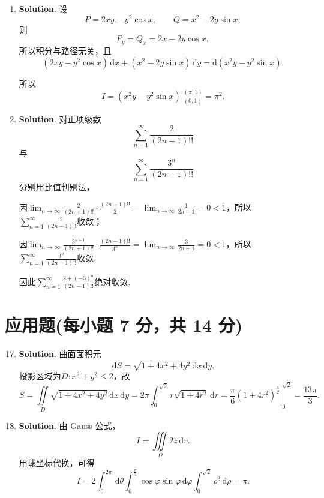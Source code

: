 \documentclass[../main.tex]{subfiles}
\begin{document}
\begin{enumerate}
    \item \textbf{Solution}. 设
          \[
              P = 2xy-y^{2}\cos x,\qquad Q = x^{2}-2y\sin x,
          \]
          则
          \[
              P_y=Q_x=2x-2y\cos x,
          \]
          所以积分与路径无关，且
          \[
              \left(2xy-y^{2}\cos x\right)\,\mathrm{d}x+\left(x^{2}-2y\sin x\right)\,\mathrm{d}y=\mathrm{d}(x^{2}y-y^{2}\sin x).
          \]

          所以
          \[
              I = \left(x^{2}y-y^{2}\sin x\right)\Big|_{(0,1)}^{(\pi,1)} = \pi^2.
          \]

    \item \textbf{Solution}. 对正项级数
          \[
              \sum_{n=1}^{\infty}\frac{2}{(2n-1)!!}
          \]
          与
          \[
              \sum_{n=1}^{\infty}\frac{3^{n}}{(2n-1)!!}
          \]
          分别用比值判别法，

          因$\lim_{n\to\infty}\frac{2}{(2n+1)!!}\cdot\frac{(2n-1)!!}{2}=\lim_{n\to\infty}\frac{1}{2n+1}=0<1$，所以$\sum\limits_{n=1}^{\infty}\frac{2}{(2n-1)!!}$收敛；

          因$\lim_{n\to\infty}\frac{3^{n+1}}{(2n+1)!!}\cdot\frac{(2n-1)!!}{3^n}=\lim_{n\to\infty}\frac{3}{2n+1}=0<1$，所以$\sum\limits_{n=1}^{\infty}\frac{3^{n}}{(2n-1)!!}$收敛.

          因此$\sum\limits_{n=1}^{\infty}\frac{2+(-3)^{n}}{(2n-1)!!}$绝对收敛.

\end{enumerate}

\section{应用题(每小题 7 分，共 14 分)}
\begin{enumerate}
    \setcounter{enumi}{16}
    \item \textbf{Solution}. 曲面面积元
          \[
              \mathrm{d}S=\sqrt{1+4x^{2}+4y^{2}}\,\mathrm{d}x\,\mathrm{d}y.
          \]
          投影区域为$D:x^{2}+y^{2}\le2$，故
          \[
              S=\iint\limits_{D}\sqrt{1+4x^{2}+4y^{2}}\,\mathrm{d}x\,\mathrm{d}y
              =2\pi\int_{0}^{\sqrt2}r\sqrt{1+4r^{2}}\,\mathrm{d}r
              =\left.\frac{\pi}{6}\left(1+4r^2\right)^{\frac{3}{2}}\right|_{0}^{\sqrt2}
              =\frac{13\pi}{3}.
          \]

    \item \textbf{Solution}. 由 Gauss 公式，
          \[
              I=\iiint\limits_{\Omega}2z\,\mathrm{d}v.
          \]
          用球坐标代换，可得
          \[
              I=2\int_{0}^{2\pi}\,\mathrm{d}\theta\int_{0}^{\frac{\pi}{4}}\cos\varphi\sin\varphi\,\mathrm{d}\varphi\int_{0}^{\sqrt2}\rho^{3}\,\mathrm{d}\rho=\pi.
          \]

\end{enumerate}
\end{document}

